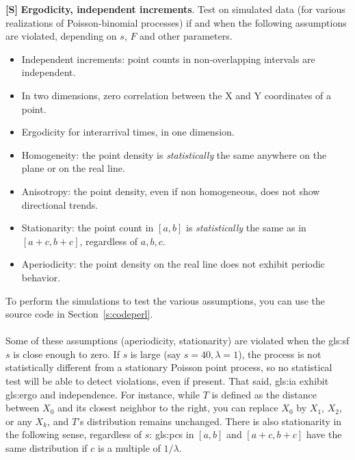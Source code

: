 \documentclass[10pt]{article}
\begin{document}
\begin{Exercise}\label{exercise4}
{\bf [S]}
{\bf Ergodicity, independent increments}. Test on simulated data (for various realizations of Poisson-binomial processes) if and when the following assumptions are violated, depending on $s$, $F$ and other parameters.
\begin{itemize}
\item Independent increments: point counts in non-overlapping intervals are independent.
\item In two dimensions, zero correlation between the X and Y coordinates of a point.
\item Ergodicity for interarrival times, in one dimension.
\item Homogeneity: the point density is {\em statistically} the same anywhere on the plane or on the real line.
\item Anisotropy: the point density, even if non homogeneous, does not show directional trends.
\item Stationarity: the point count in $[a,b]$ is {\em statistically} the same as in $[a+c,b+c]$, regardless of $a,b,c$.
\item Aperiodicity: the point density on the real line does not exhibit periodic behavior.
\end{itemize}
To perform the simulations to test the various assumptions, you can use the source code in Section~\ref{s:codeperl}. \vspace{1ex} \\
 \vspace{1ex} \\
Some of these assumptions (aperiodicity, stationarity) are violated when the \gls{gls:sf} $s$ is close enough to zero. If $s$ is large (say $s=40,\lambda=1$), the process is not statistically different from a stationary Poisson point process, so no statistical test will be able to detect violations, even if present. That said,
\gls{gls:ia} exhibit \gls{gls:ergo} and independence. For instance, while $T$ is defined as the distance between $X_0$ and its closest neighbor to the right, you can replace $X_0$ by $X_1$, $X_2$, or any $X_k$, and $T$'s distribution remains unchanged. There is also stationarity in the following sense, regardless of $s$:
\glspl{gls:pc} in $[a, b]$ and $[a+c, b+c]$ have the same distribution if $c$ is a multiple of $1/\lambda$.


\end{Exercise}
\end{document}
